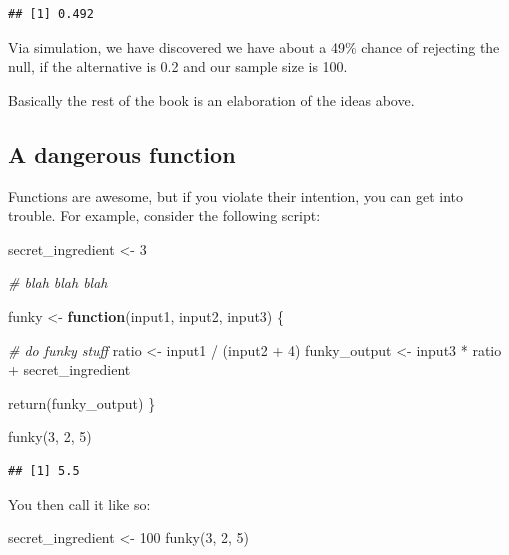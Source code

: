 \documentclass[
]{book}
\newenvironment{Shaded}{\begin{snugshade}}{\end{snugshade}}
\newcommand{\CommentTok}[1]{\textcolor[rgb]{0.56,0.35,0.01}{\textit{#1}}}
\newcommand{\ControlFlowTok}[1]{\textcolor[rgb]{0.13,0.29,0.53}{\textbf{#1}}}
\newcommand{\DecValTok}[1]{\textcolor[rgb]{0.00,0.00,0.81}{#1}}
\newcommand{\FunctionTok}[1]{\textcolor[rgb]{0.00,0.00,0.00}{#1}}
\newcommand{\NormalTok}[1]{#1}
\newcommand{\OtherTok}[1]{\textcolor[rgb]{0.56,0.35,0.01}{#1}}
\newcommand{\SpecialCharTok}[1]{\textcolor[rgb]{0.00,0.00,0.00}{#1}}
\begin{document}
\begin{verbatim}
## [1] 0.492
\end{verbatim}

Via simulation, we have discovered we have about a 49\% chance of rejecting the null, if the alternative is 0.2 and our sample size is 100.

Basically the rest of the book is an elaboration of the ideas above.

\hypertarget{a-dangerous-function}{%
\subsection{A dangerous function}\label{a-dangerous-function}}

Functions are awesome, but if you violate their intention, you can get into trouble.
For example, consider the following script:

\begin{Shaded}
\begin{Highlighting}[]
\NormalTok{secret\_ingredient }\OtherTok{\textless{}{-}} \DecValTok{3}

\CommentTok{\# blah blah blah}

\NormalTok{funky }\OtherTok{\textless{}{-}} \ControlFlowTok{function}\NormalTok{(input1, input2, input3) \{}
  
  \CommentTok{\# do funky stuff}
\NormalTok{  ratio }\OtherTok{\textless{}{-}}\NormalTok{ input1 }\SpecialCharTok{/}\NormalTok{ (input2 }\SpecialCharTok{+} \DecValTok{4}\NormalTok{)}
\NormalTok{  funky\_output }\OtherTok{\textless{}{-}}\NormalTok{ input3 }\SpecialCharTok{*}\NormalTok{ ratio }\SpecialCharTok{+}\NormalTok{ secret\_ingredient}
  
  \FunctionTok{return}\NormalTok{(funky\_output)  }
\NormalTok{\}}

\FunctionTok{funky}\NormalTok{(}\DecValTok{3}\NormalTok{, }\DecValTok{2}\NormalTok{, }\DecValTok{5}\NormalTok{)}
\end{Highlighting}
\end{Shaded}

\begin{verbatim}
## [1] 5.5
\end{verbatim}

You then call it like so:

\begin{Shaded}
\begin{Highlighting}[]
\NormalTok{secret\_ingredient }\OtherTok{\textless{}{-}} \DecValTok{100}
\FunctionTok{funky}\NormalTok{(}\DecValTok{3}\NormalTok{, }\DecValTok{2}\NormalTok{, }\DecValTok{5}\NormalTok{)}
\end{Highlighting}
\end{Shaded}
\end{document}
